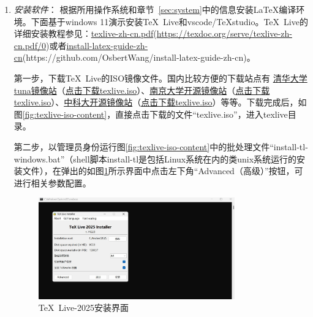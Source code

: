 \begin{enumerate}
    \item \emph{安装软件}：
        根据所用操作系统和章节~\ref{sec:system}中的信息安装\LaTeX{}编译环境。下面基于windows 11演示安装\TeX~Live和vscode/TeXstudio。\TeX~Live的详细安装教程参见：\href{https://texdoc.org/serve/texlive-zh-cn.pdf/0}{texlive-zh-cn.pdf}(\url{https://texdoc.org/serve/texlive-zh-cn.pdf/0})或者\href{https://github.com/OsbertWang/install-latex-guide-zh-cn}{install-latex-guide-zh-cn}(https://github.com/OsbertWang/install-latex-guide-zh-cn)。
        

        第一步，下载\TeX~Live的ISO镜像文件。国内比较方便的下载站点有 \href{https://mirrors.tuna.tsinghua.edu.cn}{清华大学tuna镜像站}（\href{https://mirrors.tuna.tsinghua.edu.cn/CTAN/systems/texlive/Images/texlive.iso}{点击下载texlive.iso}）、\href{https://mirror.nju.edu.cn}{南京大学开源镜像站}（\href{https://mirror.nju.edu.cn/CTAN/systems/texlive/Images/texlive.iso}{点击下载texlive.iso}）、\href{https://mirrors.ustc.edu.cn}{中科大开源镜像站}（\href{https://mirrors.ustc.edu.cn/CTAN/systems/texlive/Images/texlive.iso}{点击下载texlive.iso}）等等。下载完成后，如图\ref{fig:texlive-iso-content}，直接点击下载的文件“texlive.iso”，进入texlive目录。
        

        第二步，以管理员身份运行图\ref{fig:texlive-iso-content}中的批处理文件“install-tl-windows.bat”（shell脚本install-tl是包括Linux系统在内的类unix系统运行的安装文件），在弹出的如图\ref{fig:texlive-tl-gui}所示界面中点击左下角“Advanced（高级）”按钮，可进行相关参数配置。
        \begin{figure}[!hptb]
        \centering
        \includegraphics[width=0.8\textwidth]{doc/figures/texlive-tl-gui.jpg}
        \caption{\TeX~Live-2025安装界面}
        \label{fig:texlive-tl-gui}
        \end{figure}


\end{enumerate}
